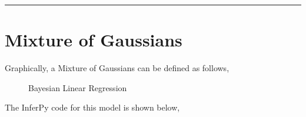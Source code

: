 \documentclass[letterpaper,10pt,english]{sphinxmanual}
\begin{document}
\begin{sphinxVerbatim}[commandchars=\\\{\}]

\PYG{p}{[} \PYG{p}{]}


\end{sphinxVerbatim}


\bigskip\hrule\bigskip



\section{Mixture of Gaussians}
\label{\detokenize{notes/probzoo:mixture-of-gaussians}}
Graphically, a Mixture of Gaussians can be defined as follows,

\begin{figure}[htbp]
\centering
\capstart

\noindent{}
\caption{Bayesian Linear Regression}\label{\detokenize{notes/probzoo:id4}}\end{figure}

The InferPy code for this model is shown below,
\end{document}
